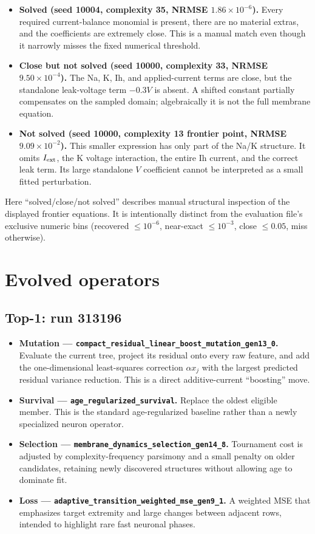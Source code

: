 \documentclass[10pt]{article}
\newcommand{\code}[1]{\nolinkurl{#1}}
\begin{document}
\begin{itemize}
  \item \textbf{Solved (seed 10004, complexity 35, NRMSE $1.86\times10^{-6}$).}
  Every required current-balance monomial is present, there are no material extras, and the
  coefficients are extremely close. This is a manual match even though it narrowly misses the
  fixed numerical threshold.
  \item \textbf{Close but not solved (seed 10000, complexity 33, NRMSE
  $9.50\times10^{-4}$).} The Na, K, Ih, and applied-current terms are close, but the standalone
  leak-voltage term $-0.3V$ is absent. A shifted constant partially compensates on the sampled
  domain; algebraically it is not the full membrane equation.
  \item \textbf{Not solved (seed 10000, complexity 13 frontier point, NRMSE $9.09\times10^{-2}$).}
  This smaller expression has only part of the Na/K structure. It omits $I_{\rm ext}$, the K
  voltage interaction, the entire Ih current, and the correct leak term. Its large standalone
  $V$ coefficient cannot be interpreted as a small fitted perturbation.
\end{itemize}

Here ``solved/close/not solved'' describes manual structural inspection of the displayed
frontier equations. It is intentionally distinct from the evaluation file's exclusive numeric
bins (recovered $\le10^{-6}$, near-exact $\le10^{-3}$, close $\le0.05$, miss otherwise).

\section*{Evolved operators}

\subsection*{Top-1: run 313196}
\begin{itemize}
  \item \textbf{Mutation --- \code{compact_residual_linear_boost_mutation_gen13_0}.}
  Evaluate the current tree, project its residual onto every raw feature, and add the
  one-dimensional least-squares correction $\alpha x_j$ with the largest predicted residual
  variance reduction. This is a direct additive-current ``boosting'' move.
  \item \textbf{Survival --- \code{age_regularized_survival}.}
  Replace the oldest eligible member. This is the standard age-regularized baseline rather than
  a newly specialized neuron operator.
  \item \textbf{Selection --- \code{membrane_dynamics_selection_gen14_8}.}
  Tournament cost is adjusted by complexity-frequency parsimony and a small penalty on older
  candidates, retaining newly discovered structures without allowing age to dominate fit.
  \item \textbf{Loss --- \code{adaptive_transition_weighted_mse_gen9_1}.}
  A weighted MSE that emphasizes target extremity and large changes between adjacent rows,
  intended to highlight rare fast neuronal phases.
\end{itemize}
\end{document}
